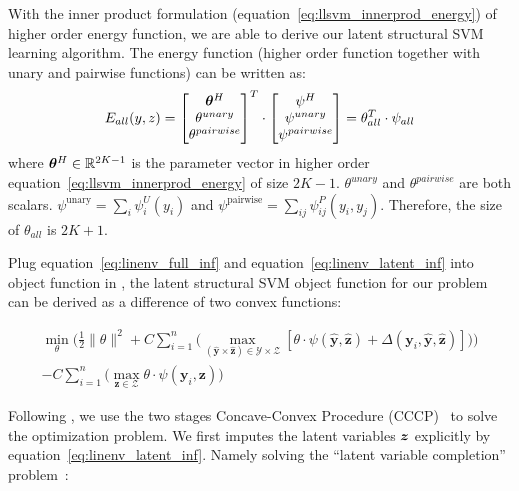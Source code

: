With the inner product formulation
(equation~\eqref{eq:llsvm_innerprod_energy}) of higher order
energy function, we are able to derive our latent
structural SVM learning algorithm. The energy function (higher
order function together with unary and pairwise functions) can be
written as:
\begin{equation}
  E_{all}(y,z) = \begin{bmatrix}
    {\bm{\theta}}^H\\
    \theta^{unary}\\
    \theta^{pairwise}
  \end{bmatrix}^T 
  \cdot \begin{bmatrix}
    \psi^H\\
    \psi^{unary}\\
    \psi^{pairwise}
  \end{bmatrix}=\theta_{all}^T\cdot\psi_{all}
\end{equation}
where ${\bm{\theta}}^H\in {\mathbb{R}}^{2K-1}$ is the parameter vector in higher
order equation~\eqref{eq:llsvm_innerprod_energy} of size $2K-1$.
$\theta^{unary}$ and $\theta^{pairwise}$ are both scalars.
$\psi^\textrm{unary} = \sum_i \psi^U_i\!(y_i)$ and
$\psi^\textrm{pairwise} = \sum_{ij} \psi^P_{ij}(y_i, y_j)$.
Therefore, the size of $\theta_{all}$ is $2K+1$.

Plug equation~\eqref{eq:linenv_full_inf} and
equation~\eqref{eq:linenv_latent_inf} into object function in
\cite{yu2009learning}, the latent structural SVM object function
for our problem can be derived as a difference of two convex
functions:

\begin{align}
\label{eq:lssvm_object}
  \min_\theta\bigg(\frac{1}{2}\|\theta\|^2+
  C\sum_{i=1}^{n}\big(\max_{(\mathbf{\hat{y}} \times
  \mathbf{\hat{z}}) \in \mathcal{Y} \times \mathcal{Z}}
  [\theta\cdot\psi(\mathbf{\hat{y}},\mathbf{\hat{z}}) +
  \Delta(\mathbf{y}_i,\mathbf{\hat{y}},\mathbf{\hat{z}})]\big)\bigg)\\
  -C\sum_{i=1}^{n}\big(\max_{\mathbf{z} \in \mathcal{Z}} \theta \cdot
  \psi(\mathbf{y}_i,\mathbf{z})\big)\nonumber
\end{align}

Following , we use the two stages
Concave-Convex Procedure (CCCP)~\cite{yuille2002concave} to solve
the optimization problem. We first imputes the latent variables
${\bm{z}}$ explicitly by equation~\eqref{eq:linenv_latent_inf}. Namely
solving the ``latent variable completion''
problem~\cite{yu2009learning}:

